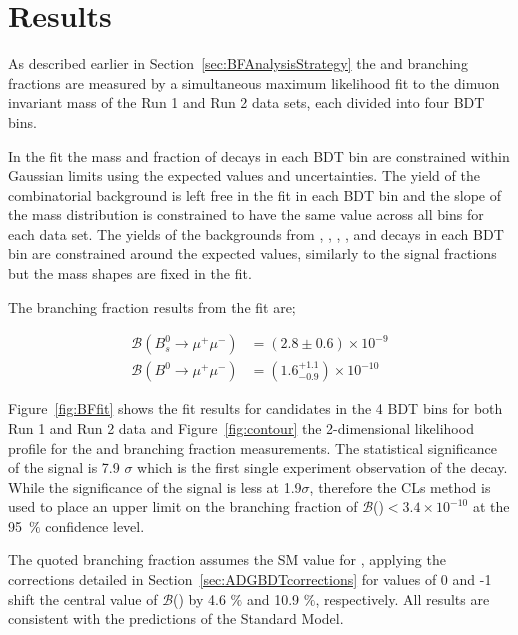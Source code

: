 {{\section{Results}
\label{sec:BFResults}

As described earlier in Section~\ref{sec:BFAnalysisStrategy} the \bsmumu and \bmumu branching fractions are measured by a simultaneous maximum likelihood fit to the dimuon invariant mass of the Run 1 and Run 2 data sets, each divided into four BDT bins. 

In the fit the mass \pdfs and fraction of \bmumu decays in each BDT bin are constrained within Gaussian limits using the expected values and uncertainties. The yield of the combinatorial background is left free in the fit in each BDT bin and the slope of the mass distribution is constrained to have the same value across all bins for each data set. The yields of the backgrounds from \bhh, \bdpimunu, \bsKmunu, \bpimumu, \bdpimumu and \bcjpsimunu decays in each BDT bin are constrained around the expected values, similarly to the signal fractions but the mass shapes are fixed in the fit.

The branching fraction results from the fit are;

\begin{equation}
\begin{split}
  \mathcal{B}(B^{0}_{s} \to \mu^{+} \mu^{-}) &= (2.8 \pm 0.6) \times 10^{-9} \\
  \mathcal{B}(B^{0} \to \mu^{+} \mu^{-}) &= (1.6^{+1.1}_{-0.9})    \times 10^{-10} 
\end{split}
\label{eq:BFresults}
\end{equation}

Figure~\ref{fig:BFfit} shows the fit results for \bmumu candidates in the 4 BDT bins for both Run 1 and Run 2 data and Figure~\ref{fig:contour} the 2-dimensional likelihood profile for the \bdmumu and \bsmumu branching fraction measurements.
The statistical significance of the \bsmumu signal is 7.9 $\sigma$ which is the first single experiment observation of the \bsmumu decay. While the significance of the \bdmumu signal is less at 1.9$\sigma$, therefore the CLs method is used to place an upper limit on the branching fraction of $\mathcal{B}$(\bdmumu)$ < 3.4 \times 10^{-10}$  at the 95~$\%$ confidence level.

The quoted \bsmumu branching fraction assumes the SM value for \ADG, applying the corrections detailed in Section~\ref{sec:ADGBDTcorrections} for \ADG values of 0 and -1 shift the central value of $\mathcal{B}$(\bsmumu) by 4.6 $\%$ and 10.9 $\%$, respectively. All results are consistent with the predictions of the Standard Model.



}}
